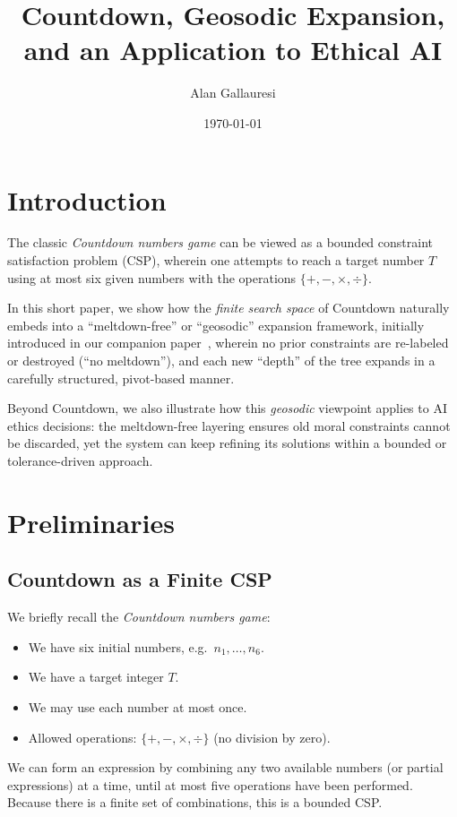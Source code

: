 \documentclass[11pt]{article}
\title{Countdown, Geosodic Expansion, \\
and an Application to Ethical AI}
\author{Alan Gallauresi}
\date{\today}
\theoremstyle{definition}
\theoremstyle{remark}
\begin{document}
\maketitle

\section{Introduction}
\label{sec:intro}

The classic \emph{Countdown numbers game} can be viewed as a bounded
constraint satisfaction problem (CSP), wherein one attempts to reach a target
number $T$ using at most six given numbers with the operations
$\{ +, -, \times, \div \}$.

In this short paper, we show how the \emph{finite search space} of Countdown
naturally embeds into a ``meltdown-free'' or ``geosodic'' expansion framework,
initially introduced in our companion paper~\cite{geosodicArxiv}, wherein no
prior constraints are re-labeled or destroyed (``no meltdown''), and each new
``depth'' of the tree expands in a carefully structured, pivot-based manner.

Beyond Countdown, we also illustrate how this \emph{geosodic} viewpoint applies
to AI ethics decisions: the meltdown-free layering ensures old moral constraints
cannot be discarded, yet the system can keep refining its solutions within a
bounded or tolerance-driven approach.
 \section{Preliminaries}
\label{sec:prelims}

\subsection{Countdown as a Finite CSP}
We briefly recall the \emph{Countdown numbers game}:
\begin{itemize}
  \item We have six initial numbers, e.g.\ $n_1, \dots, n_6$.
  \item We have a target integer $T$.
  \item We may use each number at most once.
  \item Allowed operations: $\{+, -, \times, \div\}$ (no division by zero).
\end{itemize}
We can form an expression by combining any two available numbers (or partial
expressions) at a time, until at most five operations have been performed.
Because there is a finite set of combinations, this is a bounded CSP.
\end{document}
